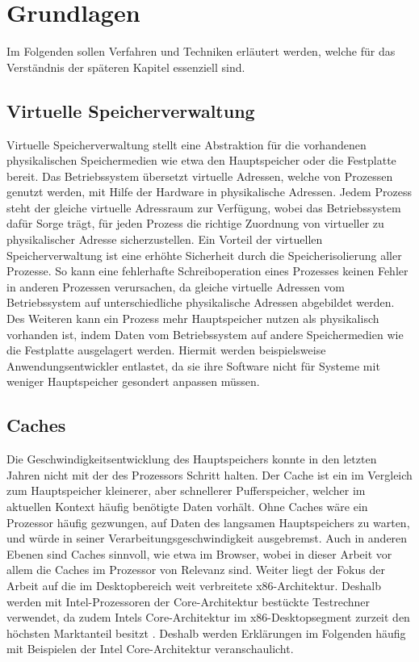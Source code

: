 \chapter{Grundlagen}
\label{chapter:basics}

Im Folgenden sollen Verfahren und Techniken erläutert werden, welche für das Verständnis der späteren Kapitel essenziell sind.

\section{Virtuelle Speicherverwaltung}

Virtuelle Speicherverwaltung stellt eine Abstraktion für die vorhandenen physikalischen Speichermedien wie etwa den Hauptspeicher oder die Festplatte bereit.
Das Betriebssystem übersetzt virtuelle Adressen, welche von Prozessen genutzt werden, mit Hilfe der Hardware in physikalische Adressen. 
Jedem Prozess steht der gleiche virtuelle Adressraum zur Verfügung, wobei das Betriebssystem dafür Sorge trägt, für jeden Prozess die richtige Zuordnung von virtueller zu physikalischer Adresse sicherzustellen.
Ein Vorteil der virtuellen Speicherverwaltung ist eine erhöhte Sicherheit durch die Speicherisolierung aller Prozesse. 
So kann eine fehlerhafte Schreiboperation eines Prozesses keinen Fehler in anderen Prozessen verursachen, da gleiche virtuelle Adressen vom Betriebssystem auf unterschiedliche physikalische Adressen abgebildet werden. 
Des Weiteren kann ein Prozess mehr Hauptspeicher nutzen als physikalisch vorhanden ist, indem Daten vom Betriebssystem auf andere Speichermedien wie die Festplatte ausgelagert werden. Hiermit werden beispielsweise Anwendungsentwickler entlastet, da sie ihre Software nicht für Systeme mit weniger Hauptspeicher gesondert anpassen müssen.

\section{Caches}

Die Geschwindigkeitsentwicklung des Hauptspeichers konnte in den letzten Jahren nicht mit der des Prozessors Schritt halten. Der Cache ist ein im Vergleich zum Hauptspeicher kleinerer, aber schnellerer Pufferspeicher, welcher im aktuellen Kontext häufig benötigte Daten vorhält. 
Ohne Caches wäre ein Prozessor häufig gezwungen, auf Daten des langsamen Hauptspeichers zu warten, und würde in seiner Verarbeitungsgeschwindigkeit ausgebremst. 
Auch in anderen Ebenen sind Caches sinnvoll, wie etwa im Browser, wobei in dieser Arbeit vor allem die Caches im Prozessor von Relevanz sind. 
Weiter liegt der Fokus der Arbeit auf die im Desktopbereich weit verbreitete x86-Architektur. Deshalb werden mit Intel-Prozessoren der Core-Architektur bestückte Testrechner verwendet, da zudem Intels Core-Architektur im x86-Desktopsegment zurzeit den höchsten Marktanteil besitzt \cite{AMDIntelMarketShare}. Deshalb werden Erklärungen im Folgenden häufig mit Beispielen der Intel Core-Architektur veranschaulicht.

